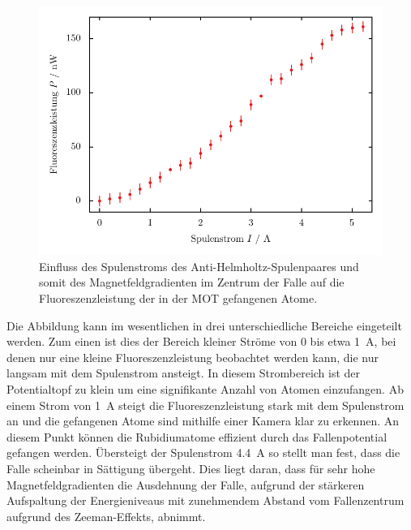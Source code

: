 \documentclass[11pt, a4paper]{article}
\numberwithin{equation}{section}
\begin{document}
\begin{figure}[hp]
	\centering
	\includegraphics{./figures/magnetic_field.pdf}
	\caption{Einfluss des Spulenstroms des Anti-Helmholtz-Spulenpaares und somit des Magnetfeldgradienten im Zentrum der Falle auf die Fluoreszenzleistung der in der MOT gefangenen Atome.}
	\label{fig:magnetic_field}
	\vspace{1cm}
	\begin{minipage}[t]{0.3\textwidth}
		\centering
		\vspace*{-\dimexpr\baselineskip+\heavyrulewidth+\abovetopsep\relax}
		
	\end{minipage} 
	\begin{minipage}[t]{0.3\textwidth}
		\centering
		\vspace*{-\dimexpr\baselineskip+\heavyrulewidth+\abovetopsep\relax}
		
	\end{minipage}
	\label{tab:magnetic_field}
\end{figure}

Die Abbildung kann im wesentlichen in drei unterschiedliche Bereiche eingeteilt werden.
Zum einen ist dies der Bereich kleiner Ströme von \num{0} bis etwa \SI{1}{\ampere}, bei denen nur eine kleine Fluoreszenzleistung beobachtet werden kann, die nur langsam mit dem Spulenstrom ansteigt.
In diesem Strombereich ist der Potentialtopf zu klein um eine signifikante Anzahl von Atomen einzufangen.
Ab einem Strom von \SI{1}{\ampere} steigt die Fluoreszenzleistung stark mit dem Spulenstrom an und die gefangenen Atome sind mithilfe einer Kamera klar zu erkennen.
An diesem Punkt können die Rubidiumatome effizient durch das Fallenpotential gefangen werden.
Übersteigt der Spulenstrom \SI{4.4}{\ampere} so stellt man fest, dass die Falle scheinbar in Sättigung übergeht.
Dies liegt daran, dass für sehr hohe Magnetfeldgradienten die Ausdehnung der Falle, aufgrund der stärkeren Aufspaltung der Energieniveaus mit zunehmendem Abstand vom Fallenzentrum aufgrund des Zeeman-Effekts, abnimmt.
\end{document}
